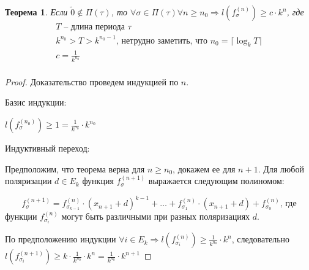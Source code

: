 \documentclass[bibliography=totoc, a4paper, 14pt]{extarticle}
\newtheorem{myth}{Теорема}
\begin{document}
\begin{myth}
\label{th2}
Если $\tilde{0} \not\in \Pi(\tau)$, то $\forall \sigma \in \Pi(\tau) \forall n \geqslant n_0 \Rightarrow 
l(f_{\sigma}^{(n)}) \geqslant c \cdot k^n$, где
$$
\begin{array}{l}
T \text{ -- длина периода }\tau \\
k^{n_0} > T > k^{n_0 - 1} \text{, нетрудно заметить, что } n_0 = \lceil \log_kT \rceil \\
c = \frac{1}{k^{n_0}} \\
\end{array}
$$
\end{myth}
\begin{proof}
Доказательство проведем индукцией по $n$.

Базис индукции:

$l(f_{\sigma}^{(n_0)}) \geqslant 1 = \frac{1}{k^{n_0}} \cdot k^{n_0}$

Индуктивный переход:

Предположим, что теорема верна для $n \geqslant n_0$, докажем ее для $n+1$.
Для любой поляризации $d \in E_k$ функция $f_{\sigma}^{(n+1)}$ выражается следующим полиномом:

$$f_{\sigma}^{(n+1)} = f_{\sigma_{k-1}}^{(n)}\cdot(x_{n+1}+d)^{k-1} + \ldots +
f_{\sigma_1}^{(n)}\cdot(x_{n+1}+d) + f^{(n)}_{\sigma_0} \text{, где} $$
функции $f_{\sigma_i}^{(n)}$ могут быть различными при разных поляризациях $d$.


По предположению индукции $\forall i \in E_k \Rightarrow l(f_{\sigma_i}^{(n)}) \geqslant
\frac{1}{k^{n_0}} \cdot k^n$, следовательно $l(f_{\sigma_i}^{(n+1)}) \geqslant
k \cdot \frac{1}{k^{n_0}} \cdot k^n = \frac{1}{k^{n_0}} \cdot k^{n+1}$
\end{proof}
\end{document}
